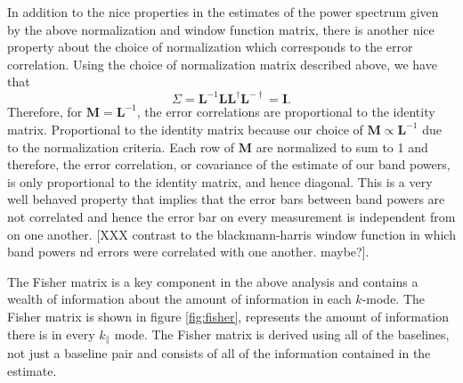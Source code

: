 \documentclass[twocolumn,numberedappendix]{emulateapj} \shorttitle{PSA64}
\begin{document}
In addition to the nice properties in the estimates of the power spectrum given
by the above normalization and window function matrix, there is another nice
property about the choice of normalization which corresponds to the error
correlation. Using the choice of normalization matrix described above, we have
that \begin{equation} 
    \Sigma = \mathbf{L}^{-1}\mathbf{L}\mathbf{L}^{\dagger}\mathbf{L}^{-\dagger}
           = \mathbf{I}.
\end{equation}
Therefore, for $\mathbf{M}=\mathbf{L}^{-1}$, the error correlations are
proportional to the identity matrix. Proportional to the identity matrix because
our choice of $\mathbf{M} \propto \mathbf{L}^{-1}$ due to the normalization
criteria. Each row of $\mathbf{M}$ are normalized to sum to 1 and therefore,
the error correlation, or covariance of the estimate of our band powers, is only
proportional to the identity matrix, and hence diagonal. This is a very well
behaved property that implies that the error bars between band powers are not
correlated and hence the error bar on every measurement is independent from on
one another. [XXX contrast to the blackmann-harris window function in which
band powers nd errors were correlated with one another. maybe?].

The Fisher matrix is a key component in the above analysis and contains a
wealth of information about the amount of information in each $k$-mode. The
Fisher matrix is shown in figure \ref{fig:fisher}, represents the amount of
information there is in every $k_{\parallel}$ mode. The Fisher matrix is derived
using all of the baselines, not just a baseline pair and consists of all of the
information contained in the estimate.
\end{document}
